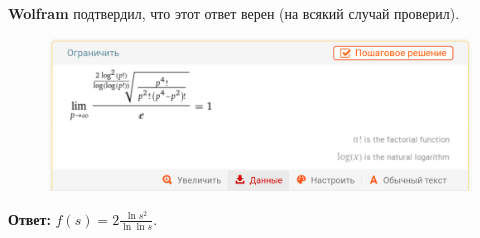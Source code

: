 \begin{solution}
\textbf{Wolfram} подтвердил, что этот ответ верен (на всякий случай проверил).
\begin{figure}[H]
    \centering
    \includegraphics[scale=0.2]{Fall/img/solution-167_confirm.png}
\end{figure}

\textbf{Ответ: } \(\displaystyle f(s) = 2\frac{\ln{s}^2}{\ln{\ln{s}}}\).

\end{solution}
